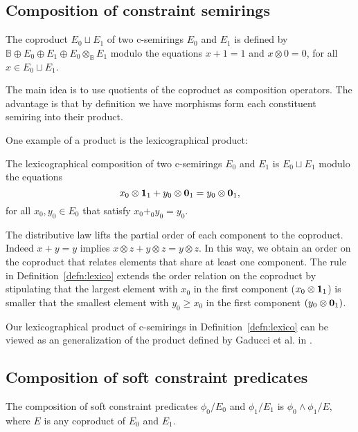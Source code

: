 \documentclass[runningheads]{llncs}
\newcommand{\defn}[1]{Definition~\ref{defn:#1}}
\begin{document}
\subsection{Composition of constraint semirings}
\label{sec:semiringcomposition}

\begin{definition}
	\label{defn:coproduct}
	The coproduct $E_0 \sqcup E_1$ of two c-semirings $E_0$ and $E_1$ is defined by $\mathbb{B} \oplus E_0 \oplus E_1 \oplus E_0 \otimes_\mathbb{B} E_1$ modulo the equations $x + 1 = 1$ and $x \otimes 0 = 0$, for all $x \in E_0 \sqcup E_1$. 
\end{definition}


The main idea is to use quotients of the coproduct as composition operators.
The advantage is that by definition we have morphisms form each constituent semiring into their product.

One example of a product is the lexicographical product:

\begin{definition}
	\label{defn:lexico}
	The lexicographical composition of two c-semirings $E_0$ and $E_1$ is $E_0 \sqcup E_1$ modulo the equations 
	$$x_0 \otimes {\bf 1}_1 + y_0 \otimes {\bf 0}_1 = y_0 \otimes {\bf 0}_1,$$ 
	for all $x_0,y_0 \in E_0$ that satisfy $x_0 +_0 y_0 = y_0$.
\end{definition}

The distributive law lifts the partial order of each component to the coproduct.
Indeed $x + y = y$ implies $x \otimes z + y \otimes z = y \otimes z$.
In this way, we obtain an order on the coproduct that relates elements that share at least one component.
The rule in \defn{lexico} extends the order relation on the coproduct by stipulating that the largest element with $x_0$ in the first component ($x_0 \otimes {\bf 1}_1$) is smaller that the smallest element with $y_0 \geq x_0$ in the first component $(y_0 \otimes {\bf 0}_1)$.

Our lexicographical product of c-semirings in \defn{lexico} can be viewed as an generalization of the product defined by Gaducci et al. in \cite{GHMW13}.


\subsection{Composition of soft constraint predicates}
\label{sec:predicatecomposition}

\begin{definition}
\label{defn:composition}
The composition of soft constraint predicates $\phi_0/E_0$ and $\phi_1/E_1$ is $\phi_0 \wedge \phi_1 / E$, where $E$ is any coproduct of $E_0$ and $E_1$.
\end{definition}
\end{document}
